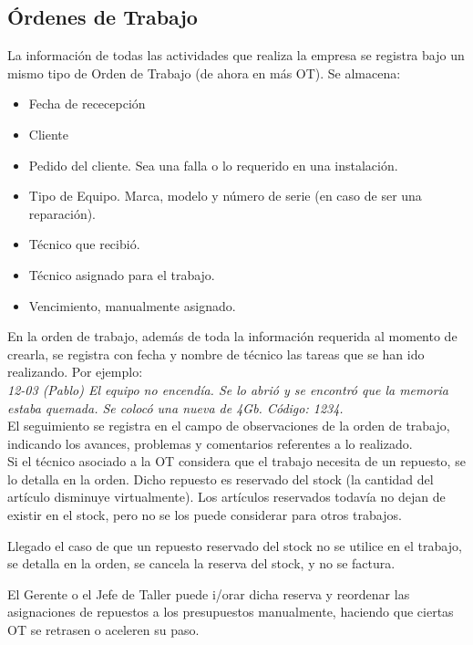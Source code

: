 \documentclass[12pt]{extarticle}
\begin{document}
\begin{spacing}{1.2}
    \subsection{Órdenes de Trabajo}
    La información de todas las actividades que realiza la empresa se registra bajo un mismo tipo de Orden de Trabajo (de ahora en más OT).
    Se almacena:
    \begin{itemize}
        \item Fecha de rececepción
        \item Cliente
        \item Pedido del cliente. Sea una falla o lo requerido en una instalación.
        \item Tipo de Equipo. Marca, modelo y número de serie (en caso de ser una reparación).
        \item Técnico que recibió. 
        \item Técnico asignado para el trabajo.
        \item Vencimiento, manualmente asignado.
    \end{itemize}

    En la orden de trabajo, además de toda la información requerida al momento de crearla, se registra con fecha y nombre de técnico las tareas que se han ido realizando.
    Por ejemplo:\\ 
    \textit{
    12-03 (Pablo) El equipo no encendía. Se lo abrió y se encontró que la memoria estaba quemada. Se colocó una nueva de 4Gb. Código: 1234.
    }\\

    El seguimiento se registra en el campo de observaciones de la orden de trabajo, indicando los avances, problemas y comentarios referentes a lo realizado.\\

    Si el técnico asociado a la OT considera que el trabajo necesita de un repuesto, se lo detalla en la orden. Dicho repuesto es reservado del stock (la cantidad del artículo disminuye virtualmente). Los artículos reservados todavía no dejan de existir en el stock, pero no se los puede considerar para otros trabajos. 

    Llegado el caso de que un repuesto reservado del stock no se utilice en el trabajo, se detalla en la orden, se cancela la reserva del stock, y no se factura.

    El Gerente o el Jefe de Taller puede i/orar dicha reserva y reordenar las asignaciones de repuestos a los presupuestos manualmente, haciendo que ciertas OT se retrasen o aceleren su paso.


\end{spacing}
\end{document}
